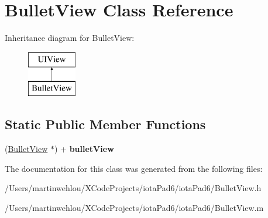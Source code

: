 \hypertarget{interface_bullet_view}{
\section{BulletView Class Reference}
\label{interface_bullet_view}
}
Inheritance diagram for BulletView:\begin{figure}[H]
\begin{center}
\leavevmode
\includegraphics[height=2.000000cm]{interface_bullet_view}
\end{center}
\end{figure}
\subsection*{Static Public Member Functions}
\begin{DoxyCompactItemize}
\item 
\hypertarget{interface_bullet_view_a9f1d471c5a808fe09a735c296492c513}{
(\hyperlink{interface_bullet_view}{BulletView} $\ast$) + {\bfseries bulletView}}
\label{interface_bullet_view_a9f1d471c5a808fe09a735c296492c513}

\end{DoxyCompactItemize}


The documentation for this class was generated from the following files:\begin{DoxyCompactItemize}
\item 
/Users/martinwehlou/XCodeProjects/iotaPad6/iotaPad6/BulletView.h\item 
/Users/martinwehlou/XCodeProjects/iotaPad6/iotaPad6/BulletView.m\end{DoxyCompactItemize}
